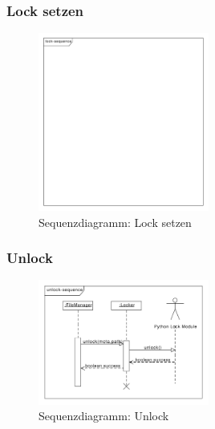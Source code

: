 \subsubsection{Lock setzen}
\begin{figure}[h]
	\centering
	\label{dia:design:frontend:sqc:lock}
	\includegraphics[width=0.5\textwidth]{design/frontend/sequence/lock-sequence.pdf}
	\caption{Sequenzdiagramm: Lock setzen}
\end{figure}

\subsubsection{Unlock}
\begin{figure}[h]
	\centering
	\label{dia:design:frontend:sqc:unlock}
	\includegraphics[width=0.5\textwidth]{design/frontend/sequence/unlock-sequence.pdf}
	\caption{Sequenzdiagramm: Unlock}
\end{figure}

